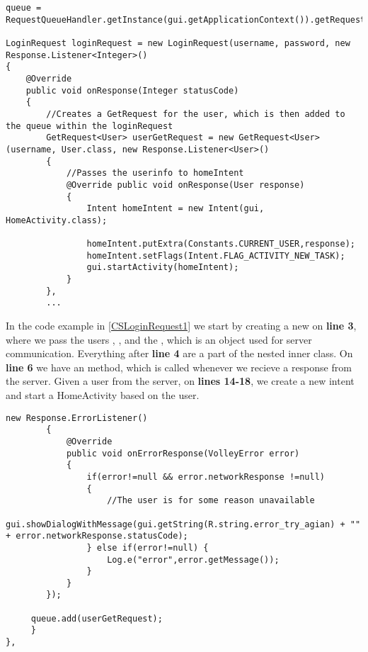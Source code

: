 \begin{minipage}[H]{\linewidth}
\begin{lstlisting}[caption = Initial request the the respective server response object, label = CSLoginRequest1]
queue = RequestQueueHandler.getInstance(gui.getApplicationContext()).getRequestQueue();

LoginRequest loginRequest = new LoginRequest(username, password, new Response.Listener<Integer>() 
{
	@Override
    public void onResponse(Integer statusCode) 
    {
    	//Creates a GetRequest for the user, which is then added to the queue within the loginRequest 
    	GetRequest<User> userGetRequest = new GetRequest<User>(username, User.class, new Response.Listener<User>() 
    	{ 
    		//Passes the userinfo to homeIntent 
    		@Override public void onResponse(User response) 
    		{
	            Intent homeIntent = new Intent(gui, HomeActivity.class);
	            
                homeIntent.putExtra(Constants.CURRENT_USER,response);
                homeIntent.setFlags(Intent.FLAG_ACTIVITY_NEW_TASK);
                gui.startActivity(homeIntent);
            }
        },
        ...
\end{lstlisting}
\end{minipage}

In the code example in \autoref{CSLoginRequest1} we start by creating a new
 on \textbf{line 3}, where we pass the users
, , and the , which is
an object used for server communication. Everything after \textbf{line 4} are
a part of the  nested inner class. On \textbf{line 6} we
have an  method, which is called whenever we recieve a
response from the server. Given a user from the server, on \textbf{lines 14-18},
we create a new intent and start a HomeActivity based on the user.\nl

\begin{minipage}[H]{\linewidth}
\begin{lstlisting}[caption = Using an errorListener to detect mishaps in the GetUserRequest, label = CSLoginRequest2]
        new Response.ErrorListener() 
        {
        	@Override
            public void onErrorResponse(VolleyError error) 
            {
            	if(error!=null && error.networkResponse !=null) 
            	{
            		//The user is for some reason unavailable
            	     gui.showDialogWithMessage(gui.getString(R.string.error_try_agian) + "" + error.networkResponse.statusCode);
                } else if(error!=null) {
                	Log.e("error",error.getMessage());
                }
            }
        });
        
     queue.add(userGetRequest);
     }
},
\end{lstlisting}
\end{minipage}

